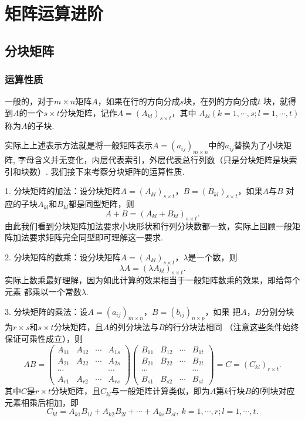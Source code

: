 \chapter{矩阵运算进阶}

\section{分块矩阵}
\subsection{运算性质}
\begin{definition}
	一般的，对于$m \times n$矩阵$A$，如果在行的方向分成$s$块，在列的方向分成$t$
	块，就得到$A$的一个$s \times t$分块矩阵，记作$A=(A_{kl})_{s \times t}$，其中
	$A_{kl}(k=1,\cdots,s;l=1,\cdots,t)$称为$A$的子块.
\end{definition}
实际上上述表示方法就是将一般矩阵表示$A=(a_{ij})_{m \times n}$中的$a_{ij}$替换为了小块矩阵,
字母含义并无变化，内层代表索引，外层代表总行列数（只是分块矩阵是块索引和块数）.
我们接下来考察分块矩阵的运算性质.

1. 分块矩阵的加法：设分块矩阵$A=(A_{kl})_{s \times t}$，$B=(B_{kl})_{s \times t}$，如果$A$与$B$
对应的子块$A_{kl}$和$B_{kl}$都是同型矩阵，则$$A+B=(A_{kl}+B_{kl})_{s \times t}.$$
由此我们看到分块矩阵加法要求小块形状和行列分块数都一致，实际上回顾一般矩阵加法要求矩阵完全同型即可理解这一要求.

2. 分块矩阵的数乘：设分块矩阵$A=(A_{kl})_{s \times t}$，$\lambda$是一个数，则
$$\lambda A=(\lambda A_{kl})_{s \times t}.$$
实际上数乘最好理解，因为如此计算的效果相当于一般矩阵数乘的效果，即给每个元素
都乘以一个常数$\lambda$.

3. 分块矩阵的乘法：设$A=(a_{ij})_{m \times n}$，$B=(b_{ij})_{n \times p}$，如果
把$A$，$B$分别分块为$r \times s$和$s \times t$分块矩阵，且$A$的列分块法与$B$的行分块法相同
（注意这些条件始终保证可乘性成立），则
$$AB=\begin{pmatrix}
	A_{11} & A_{12} & \cdots & A_{1s} \\
	A_{21} & A_{22} & \cdots & A_{2s} \\
	\cdots &  &  & \cdots \\
	A_{r1} & A_{r2} & \cdots & A_{rs}
\end{pmatrix}\begin{pmatrix}
	B_{11} & B_{12} & \cdots & B_{1t} \\
	B_{21} & B_{22} & \cdots & B_{2t} \\
	\cdots &  &  & \cdots \\
	B_{s1} & B_{s2} & \cdots & B_{st}
\end{pmatrix}=C=(C_{kl})_{r \times t}.$$
其中$C$是$r \times t$分块矩阵，且$C_{kl}$与一般矩阵计算类似，即为$A$第$k$行块$B$的$l$列块对应元素相乘后相加，即
$$C_{kl}=A_{k1}B_{1l}+A_{k2}B_{2l}+\cdots+A_{ks}B_{sl},\ k=1,\cdots,r;l=1,\cdots,t.$$


